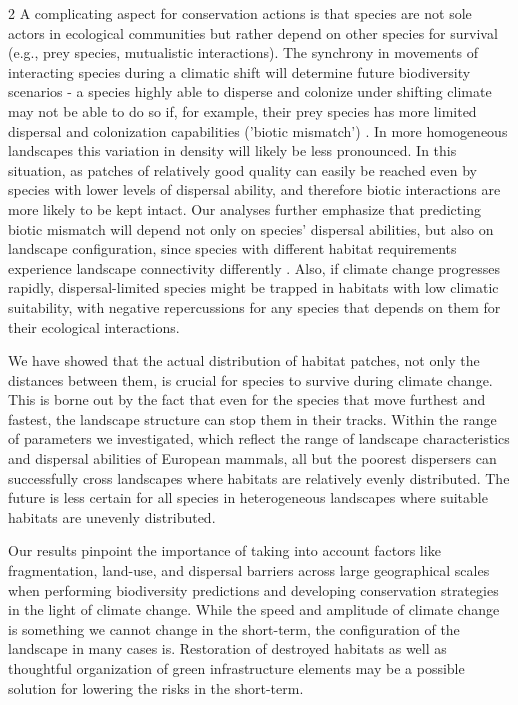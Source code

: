 \documentclass[12pt,pdftex]{article}
\begin{document}
\begin{spacing}{2}
A complicating aspect for conservation actions is that species are not sole actors in ecological communities but rather depend on other species for survival (e.g., prey species, mutualistic interactions). The synchrony in movements of interacting species during a climatic shift will determine future biodiversity scenarios - a species highly able to disperse and colonize under shifting climate may not be able to do so if, for example, their prey species has more limited dispersal and colonization capabilities ('biotic mismatch')  \citep{Chivers2017}. In more homogeneous landscapes this variation in density will likely be less pronounced. In this situation, as patches of relatively good quality can easily be reached even by species with lower levels of dispersal ability, and therefore biotic interactions are more likely to be kept intact. Our analyses further emphasize that predicting biotic mismatch will depend not only on species' dispersal abilities, but also on landscape configuration, since species with different habitat requirements experience landscape connectivity differently  \citep{Taylor1993}. Also, if climate change progresses rapidly, dispersal-limited species might be trapped in habitats with low climatic suitability, with negative repercussions for any species that depends on them for their ecological interactions.

We have showed that the actual distribution of habitat patches, not only the distances between them, is crucial for species to survive during climate change. This is borne out by the fact that even for the species that move furthest and fastest, the landscape structure can stop them in their tracks. Within the range of parameters we investigated, which reflect the range of landscape characteristics and dispersal abilities of European mammals, all but the poorest dispersers can successfully cross landscapes where habitats are relatively evenly distributed. The future is less certain for all species in heterogeneous landscapes where suitable habitats are unevenly distributed. 


Our results pinpoint the importance of taking into account factors like fragmentation, land-use, and dispersal barriers across large geographical scales when performing biodiversity predictions and developing conservation strategies in the light of climate change. While the speed and amplitude of climate change is something we cannot change in the short-term, the configuration of the landscape in many cases is. Restoration of destroyed habitats as well as thoughtful organization of green infrastructure elements  \citep{Benedict2006} may be a possible solution for lowering the risks in the short-term.



\end{spacing}
\end{document}
